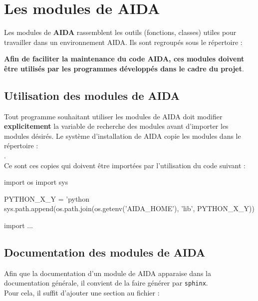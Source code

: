 \section{Les modules de AIDA}
  Les modules de \textbf{AIDA} rassemblent les outils (fonctions, classes)
utiles pour travailler dans un environnement AIDA. Ils sont regroupés sous le
répertoire : \\
\-\hspace{1cm} 

\medbreak
\textbf{Afin de faciliter la maintenance du code AIDA, ces modules
doivent être utilisés par les programmes développés dans le cadre du projet}.

\subsection{Utilisation des modules de AIDA}
\label{sec:import_AIDA}
  Tout programme souhaitant utiliser les modules de AIDA doit modifier
\textbf{explicitement} la variable de recherche des modules avant d'importer
les modules désirés.
Le système d'installation de AIDA copie les modules dans le répertoire : \\
\-\hspace{1cm} . \\
Ce sont ces copies qui doivent être importées par l'utilisation du code
suivant :

\medbreak
\begin{boxedverbatim}
import os
import sys

PYTHON_X_Y = 'python%
sys.path.append(os.path.join(os.getenv('AIDA_HOME'), 'lib', PYTHON_X_Y))

import ...

\end{boxedverbatim}

\subsection{Documentation des modules de AIDA}
  Afin que la documentation d'un module de AIDA apparaise dans la documentation
générale, il convient de la faire générer par \texttt{sphinx}. \\
Pour cela, il suffit d'ajouter une section au fichier : \\
\-\hspace{1cm} 


